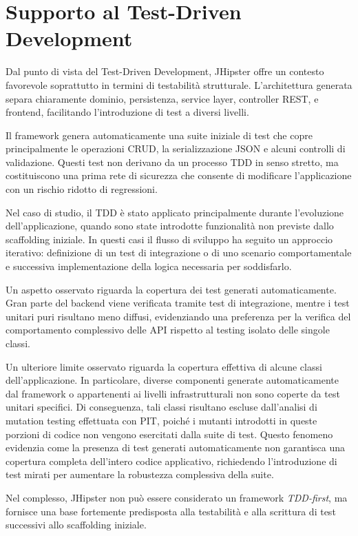 \section{Supporto al Test-Driven Development}
\label{sec:evaluation-tdd}

Dal punto di vista del Test-Driven Development, JHipster offre un contesto favorevole soprattutto in termini di testabilità strutturale. L’architettura generata separa chiaramente dominio, persistenza, service layer, controller REST, e frontend, facilitando l’introduzione di test a diversi livelli.

Il framework genera automaticamente una suite iniziale di test che copre principalmente le operazioni CRUD, la serializzazione JSON e alcuni controlli di validazione. Questi test non derivano da un processo TDD in senso stretto, ma costituiscono una prima rete di sicurezza che consente di modificare l’applicazione con un rischio ridotto di regressioni.

Nel caso di studio, il TDD è stato applicato principalmente durante l’evoluzione dell’applicazione, quando sono state introdotte funzionalità non previste dallo scaffolding iniziale. In questi casi il flusso di sviluppo ha seguito un approccio iterativo: definizione di un test di integrazione o di uno scenario comportamentale e successiva implementazione della logica necessaria per soddisfarlo.

Un aspetto osservato riguarda la copertura dei test generati automaticamente. Gran parte del backend viene verificata tramite test di integrazione, mentre i test unitari puri risultano meno diffusi, evidenziando una preferenza per la verifica del comportamento complessivo delle API rispetto al testing isolato delle singole classi.

Un ulteriore limite osservato riguarda la copertura effettiva di alcune classi dell'applicazione. In particolare, diverse componenti generate automaticamente dal framework o appartenenti ai livelli infrastrutturali non sono coperte da test unitari specifici. Di conseguenza, tali classi risultano escluse dall’analisi di mutation testing effettuata con PIT, poiché i mutanti introdotti in queste porzioni di codice non vengono esercitati dalla suite di test. Questo fenomeno evidenzia come la presenza di test generati automaticamente non garantisca una copertura completa dell’intero codice applicativo, richiedendo l’introduzione di test mirati per aumentare la robustezza complessiva della suite.

Nel complesso, JHipster non può essere considerato un framework \emph{TDD-first}, ma fornisce una base fortemente predisposta alla testabilità e alla scrittura di test successivi allo scaffolding iniziale.

